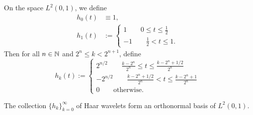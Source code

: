 \begin{definition}
    On the space $L^2(0,1)$, we define
    \begin{equation*}
    \begin{aligned}
        h_0(t) &\equiv 1, \\
        h_1(t) &:= \begin{cases}
            1 \qquad 0\le t\le \frac{1}{2} \\
            -1 \qquad \frac{1}{2}<t\le 1.
        \end{cases}
    \end{aligned}
    \end{equation*}
    Then for all $n\in\mathbb{N}$ and $2^n\le k<2^{n+1}$, define
    \begin{equation*}
        h_k(t) := \begin{cases}
            2^{n/2} \qquad \frac{k-2^n}{2^n}\le t\le \frac{k-2^n+1/2}{2^n} \\
            -2^{n/2} \qquad \frac{k-2^n+1/2}{2^n}<t\le \frac{k-2^n+1}{2^n} \\
            0 \qquad \text{otherwise}.
        \end{cases}
    \end{equation*}
\end{definition}

\begin{proposition}
\label{prop:haar-basis}
    The collection $\{h_k\}_{k=0}^\infty$ of Haar wavelets form an orthonormal basis of $L^2(0,1)$.
\end{proposition}

